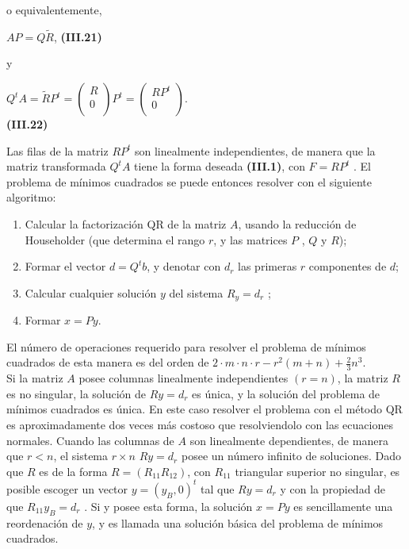 \documentclass[twocolumn,twoside]{article}
\begin{document}
o equivalentemente,
\begin{center}
  $A P = Q\tilde{R} $, \hspace{2cm}\textbf{(III.21)}
\end{center}
y 
\begin{center}
  $Q^tA=\tilde{R}P^t =
  \left(\begin{array}{c}
  R\\ 
  0\\
 \end{array}\right)P^t=
 \left(\begin{array}{cc}
  RP^t\\ 
  0\\
 \end{array}\right)
 $. \\ \vspace{0.2cm}\textbf{(III.22)}
\end{center}
Las filas de la matriz $R P^t$ son linealmente independientes, de manera que la matriz
transformada $Q^t A$ tiene la forma deseada \textbf{(III.1)}, con $F = R P^t$ . El problema de
m\'inimos cuadrados se puede entonces resolver con el siguiente algoritmo:
\begin{enumerate}[label=(\roman*)]

  \item Calcular la factorizaci\'on QR de la matriz $A$, usando la reducci\'on de Householder (que
  determina el rango $r$, y las matrices $P$ , $Q$ y $R$);
  \item Formar el vector $d = Q^t b$, y denotar con $d_r$ las primeras $r$ componentes de $d$;
  \item Calcular cualquier soluci\'on $y$ del sistema $R_y = d_r$ ;
  \item Formar $x = Py$.
\end{enumerate}

El n\'umero de operaciones requerido para resolver el problema de m\'inimos cuadrados
de esta manera es del orden de $2\cdot m\cdot n\cdot r - r^2 (m + n) + \frac{2}{3} n^3$.\\
Si la matriz $A$ posee columnas linealmente independientes $(r = n)$, la matriz $R$ es no
singular, la soluci\'on de $Ry = d_r$ es \'unica, y la soluci\'on del problema de m\'inimos cuadrados 
es \'unica. En este caso resolver el problema con el m\'etodo QR es aproximadamente
dos veces m\'as costoso que resolviendolo con las ecuaciones normales. Cuando las columnas
 de $A$ son linealmente dependientes, de manera que $r < n$, el sistema $r\times n$ $Ry = d_r$
posee un n\'umero infinito de soluciones. Dado que $R$ es de la forma $R = (R_{11} R_{12} )$, con
$R_{11}$ triangular superior no singular, es posible escoger un vector $y = (y_B , 0)^t$ tal que
$R y = d_r$ y con la propiedad de que $R_{11} y_B = d_r$ . Si y posee esta forma, la soluci\'on
$x = Py$ es sencillamente una reordenaci\'on de $y$, y es llamada una soluci\'on b\'asica del
problema de m\'inimos cuadrados.
\end{document}
